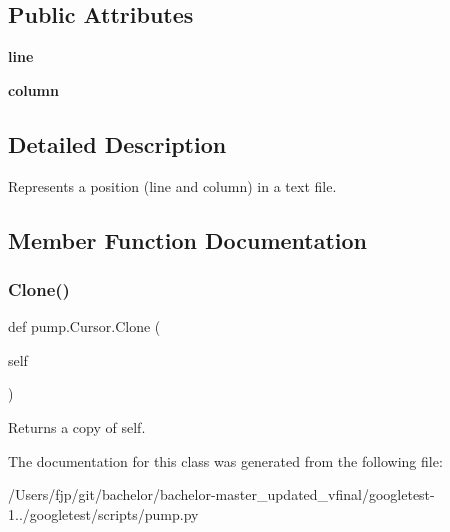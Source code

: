 \subsection*{Public Attributes}
\begin{DoxyCompactItemize}
\item 
\mbox{\label{classpump_1_1_cursor_aee8d8b67360da7fc4e635540cb41d48c}} 
{\bfseries line}
\item 
\mbox{\label{classpump_1_1_cursor_ae73db76c3a845a82afb334633864254e}} 
{\bfseries column}
\end{DoxyCompactItemize}


\subsection{Detailed Description}
\begin{DoxyVerb}Represents a position (line and column) in a text file.\end{DoxyVerb}
 

\subsection{Member Function Documentation}
\mbox{\label{classpump_1_1_cursor_af68c9be83b0af87db441b21bc6ce8114}} 
\subsubsection{\texorpdfstring{Clone()}{Clone()}}
{\footnotesize\ttfamily def pump.\+Cursor.\+Clone (\begin{DoxyParamCaption}\item[{}]{self }\end{DoxyParamCaption})}

\begin{DoxyVerb}Returns a copy of self.\end{DoxyVerb}
 

The documentation for this class was generated from the following file\+:\begin{DoxyCompactItemize}
\item 
/\+Users/fjp/git/bachelor/bachelor-\/master\+\_\+updated\+\_\+vfinal/googletest-\/1../googletest/scripts/pump.\+py\end{DoxyCompactItemize}
